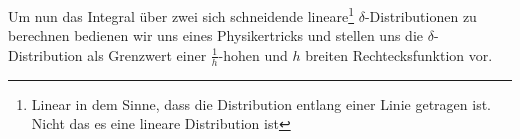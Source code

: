 Um nun das Integral über zwei sich schneidende lineare\footnote{Linear in dem Sinne, dass die Distribution entlang einer Linie getragen ist. Nicht das es eine lineare Distribution ist} $\delta$-Distributionen zu berechnen bedienen wir uns eines Physikertricks und stellen uns die $\delta$-Distribution als Grenzwert einer $\frac{1}{h}$-hohen und $h$ breiten Rechtecksfunktion vor.
